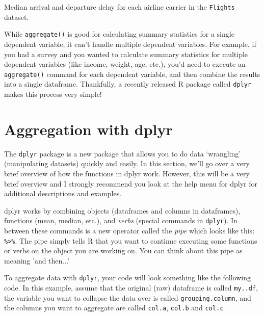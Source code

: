 \documentclass{tufte-book}\usepackage[]{graphicx}\usepackage[]{color}
\newenvironment{knitrout}{}{} %
\begin{document}
\begin{footnotesize}
\begin{marginfigure}
\begin{tiny}
\begin{knitrout}
\end{knitrout}
\end{tiny}
\caption{Median arrival and departure delay for each airline carrier in the \texttt{Flights} dataset.}
\label{fig:flightsdelay}
\end{marginfigure}


While \texttt{aggregate()} is good for calculating summary statistics for a single dependent variable, it can't handle multiple dependent variables. For example, if you had a survey and you wanted to calculate summary statistics for multiple dependent variables (like income, weight, age, etc.), you'd need to execute an \texttt{aggregate()} command for each dependent variable, and then combine the results into a single dataframe. Thankfully, a recently released R package called \texttt{dplyr} makes this process very simple!

\section{Aggregation with dplyr}

The \texttt{dplyr} package is a new package that allows you to do data `wrangling' (manipulating datasets) quickly and easily. In this section, we'll go over a very brief overview of how the functions in dplyr work. However, this will be a very brief overview and I strongly recommend you look at the help menu for dplyr for additional descriptions and examples.

dplyr works by combining objects (dataframes and columns in dataframes), functions (mean, median, etc.), and \textit{verbs} (special commands in \texttt{dplyr}). In between these commands is a new operator called the \textit{pipe} which looks like this: \texttt{\%>\%}. The pipe simply tells R that you want to continue executing some functions or verbs on the object you are working on. You can think about this pipe as meaning 'and then...'

To aggregate data with \texttt{dplyr}, your code will look something like the following code. In this example, assume that the original (raw) dataframe is called 
\texttt{my..df}, the variable you want to collapse the data over is called \texttt{grouping.column}, and the columns you want to aggregate are called \texttt{col.a}, \texttt{col.b} and \texttt{col.c}


\end{footnotesize}
\end{document}
